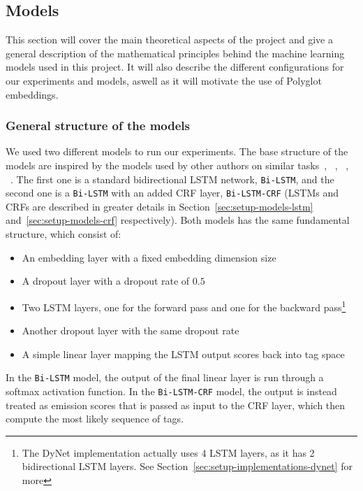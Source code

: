 
\subsection{Models}

This section will cover the main theoretical aspects of the project and give a
general description of the mathematical principles behind the machine learning
models used in this project. It will also describe the different configurations
for our experiments and models, aswell as it will motivate the use of Polyglot
embeddings.


\subsubsection{General structure of the models}

We used two different models to run our experiments. The base structure of the
models are inspired by the models used by other authors on similar
tasks~\cite{huang2015bidirectional}, ~\cite{plank2016multilingual},
~\cite{reimers2017reporting}, ~\cite{ma2016endtoend}. The first one is a
standard bidirectional LSTM network, \texttt{Bi-LSTM}, and the second one is a
\texttt{Bi-LSTM} with an added CRF layer, \texttt{Bi-LSTM-CRF} (LSTMs and CRFs
are described in greater details in Section~\ref{sec:setup-models-lstm}
and~\ref{sec:setup-models-crf} respectively). Both models has the same
fundamental structure, which consist of:

\begin{itemize}
    \item An embedding layer with a fixed embedding dimension size
    \item A dropout layer with a dropout rate of $0.5$
    \item Two LSTM layers, one for the forward pass and one for the backward
        pass\footnote{The DyNet implementation actually uses 4 LSTM layers, as
            it has 2 bidirectional LSTM layers. See
        Section~\ref{sec:setup-implementations-dynet} for more}
    \item Another dropout layer with the same dropout rate
    \item A simple linear layer mapping the LSTM output scores back into tag
        space
\end{itemize}

In the \texttt{Bi-LSTM} model, the output of the final linear layer is run
through a softmax activation function. In the \texttt{Bi-LSTM-CRF} model, the
output is instead treated as emission scores that is passed as input to the CRF
layer, which then compute the most likely sequence of tags.

